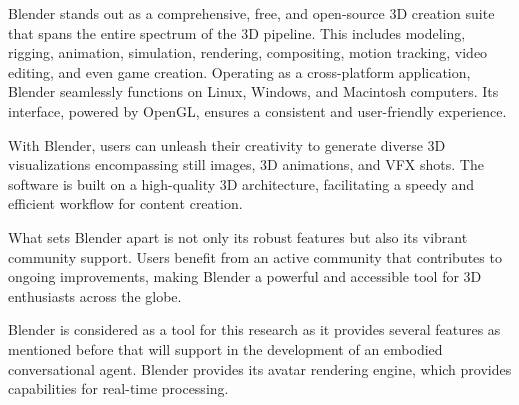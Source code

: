 Blender stands out as a comprehensive, free, and open-source 3D creation suite that spans the entire spectrum of the 3D pipeline. This includes modeling, rigging, animation, simulation, rendering, compositing, motion tracking, video editing, and even game creation. Operating as a cross-platform application, Blender seamlessly functions on Linux, Windows, and Macintosh computers. Its interface, powered by OpenGL, ensures a consistent and user-friendly experience.

With Blender, users can unleash their creativity to generate diverse 3D visualizations encompassing still images, 3D animations, and VFX shots. The software is built on a high-quality 3D architecture, facilitating a speedy and efficient workflow for content creation.

What sets Blender apart is not only its robust features but also its vibrant community support. Users benefit from an active community that contributes to ongoing improvements, making Blender a powerful and accessible tool for 3D enthusiasts across the globe. 

Blender is considered as a tool for this research as it
provides several features as mentioned before that will support in the development of an embodied conversational agent. Blender provides its avatar rendering engine, which
provides capabilities for real-time processing. 